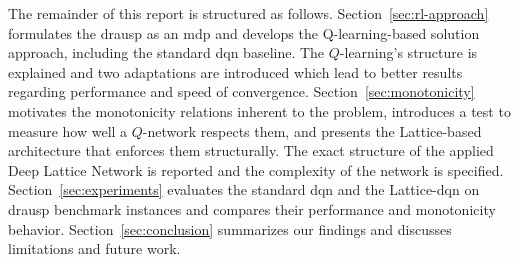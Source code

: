 The remainder of this report is structured as follows. Section~\ref{sec:rl-approach} 
formulates the \acs{drausp} as an \acs{mdp} and
develops the Q-learning-based solution approach, including the standard \acs{dqn} baseline.
The $Q$-learning's structure is explained and two adaptations are introduced which lead to
better results regarding performance and speed of convergence.
Section~\ref{sec:monotonicity} motivates the monotonicity relations inherent to the problem,
introduces a test to measure how well a $Q$-network respects them, and presents the Lattice-based
architecture that enforces them structurally. The exact structure of the applied Deep Lattice Network
is reported and the complexity of the network is specified.
Section~\ref{sec:experiments} evaluates the standard
\acs{dqn} and the Lattice-\acs{dqn} on \acs{drausp} benchmark instances and compares their
performance and monotonicity behavior. Section~\ref{sec:conclusion} summarizes our findings and
discusses limitations and future work.

